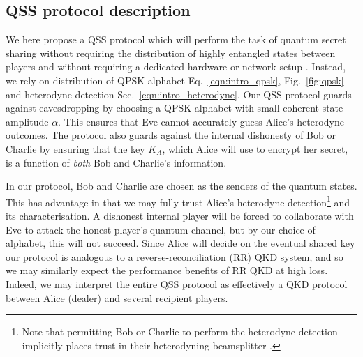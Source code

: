 \subsection{QSS protocol description}

We here propose a QSS protocol which will perform the task of quantum secret sharing without requiring the distribution of highly entangled states between players \cite{Kogias2017} and without requiring a dedicated hardware or network setup \cite{Grice2019}. Instead, we rely on distribution of QPSK alphabet Eq.~\ref{eqn:intro_qpsk}, Fig.~\ref{fig:qpsk} and heterodyne detection Sec.~\ref{eqn:intro_heterodyne}. Our QSS protocol guards against eavesdropping by choosing a QPSK alphabet with small coherent state amplitude $\alpha$. This ensures that Eve cannot accurately guess Alice's heterodyne outcomes. The protocol also guards against the internal dishonesty of Bob or Charlie by ensuring that the key $K_A$, which Alice will use to encrypt her secret, is a function of \emph{both} Bob and Charlie's information.

In our protocol, Bob and Charlie are chosen as the senders of the quantum states. This has advantage in that we may fully trust Alice's heterodyne detection\footnote{Note that permitting Bob or Charlie to perform the heterodyne detection implicitly places trust in their heterodyning beamsplitter \cite{Walk2016a}. %
} and its characterisation. A dishonest internal player will be forced to collaborate with Eve to attack the honest player's quantum channel, but by our choice of alphabet, this will not succeed. Since Alice will decide on the eventual shared key our protocol is analogous to a reverse-reconciliation (RR) QKD system, and so we may similarly expect the performance benefits of RR QKD at high loss. Indeed, we may interpret the entire QSS protocol as effectively a QKD protocol between Alice (dealer) and several recipient players.

